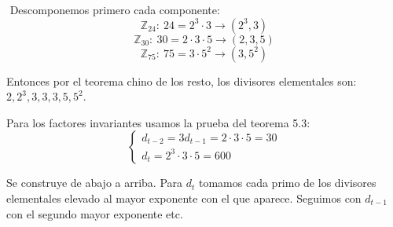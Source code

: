 \documentclass[openany]{book}
\begin{document}
\begin{exercise}
    $ $
    Descomponemos primero cada componente:
    $$ \mathbb{Z}_{24}:\ 24 = 2^3\cdot 3 \to (2^3,3) $$
    $$ \mathbb{Z}_{30}:\ 30 = 2\cdot 3\cdot 5 \to (2,3,5) $$
    $$ \mathbb{Z}_{75}:\ 75 = 3\cdot 5^2 \to (3,5^2) $$

    Entonces por el teorema chino de los resto, los divisores elementales son: $ 2,2^3,3,3,3,5,5^2$.

    Para los factores invariantes usamos la prueba del teorema 5.3:
    $$ 
    \left\{
    \begin{array}{ll}
        d_{t-2} = 3
        d_{t-1} = 2\cdot 3\cdot 5 = 30\\
        d_{t} = 2^3\cdot 3\cdot 5 = 600
    \end{array}
    \right.
    $$

    Se construye de abajo a arriba. Para $ d_{t}$ tomamos cada primo de los divisores elementales elevado al mayor exponente con el que aparece. Seguimos con $ d_{t-1}$ con el segundo mayor exponente etc.
\end{exercise}
\end{document}
